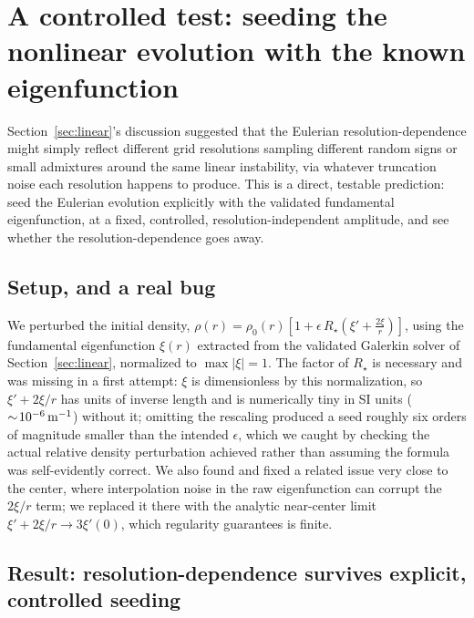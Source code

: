 \documentclass[11pt]{article}
\begin{document}
\section{A controlled test: seeding the nonlinear evolution with the known eigenfunction}
\label{sec:seeded}

Section~\ref{sec:linear}'s discussion suggested that the Eulerian resolution-dependence might simply reflect different grid resolutions sampling different random signs or small admixtures around the same linear instability, via whatever truncation noise each resolution happens to produce. This is a direct, testable prediction: seed the Eulerian evolution explicitly with the validated fundamental eigenfunction, at a fixed, controlled, resolution-independent amplitude, and see whether the resolution-dependence goes away.

\subsection{Setup, and a real bug}

We perturbed the initial density, $\rho(r)=\rho_0(r)\left[1+\epsilon\,R_\star\left(\xi'+\tfrac{2\xi}{r}\right)\right]$, using the fundamental eigenfunction $\xi(r)$ extracted from the validated Galerkin solver of Section~\ref{sec:linear}, normalized to $\max|\xi|=1$. The factor of $R_\star$ is necessary and was missing in a first attempt: $\xi$ is dimensionless by this normalization, so $\xi'+2\xi/r$ has units of inverse length and is numerically tiny in SI units ($\sim\!10^{-6}\,{\rm m}^{-1}$) without it; omitting the rescaling produced a seed roughly six orders of magnitude smaller than the intended $\epsilon$, which we caught by checking the actual relative density perturbation achieved rather than assuming the formula was self-evidently correct. We also found and fixed a related issue very close to the center, where interpolation noise in the raw eigenfunction can corrupt the $2\xi/r$ term; we replaced it there with the analytic near-center limit $\xi'+2\xi/r\to3\xi'(0)$, which regularity guarantees is finite.

\subsection{Result: resolution-dependence survives explicit, controlled seeding}
\end{document}

